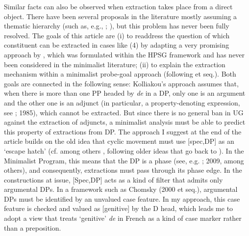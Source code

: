 \documentclass[output=paper]{langsci/langscibook}
\begin{document}
Similar facts can also be observed when extraction takes place from a direct object. There have been several proposals in the literature mostly assuming a thematic hierarchy (such as, e.g., \citealt{Pollock1989}; \citealt{Godard1992}), but this problem has never been fully resolved. The goals of this article are (i) to readdress the question of which constituent can be extracted in cases like (4) by adapting a very promising approach by \citet{Kolliakou1999}, which was formulated within the HPSG framework and has never been considered in the minimalist literature; (ii) to explain the extraction mechanism within a minimalist probe-goal approach (following \citealt{Chomsky2000} et seq.). Both goals are connected in the following sense: Kolliakou’s approach assumes that, when there is more than one PP headed by \textit{de} in a DP, only one is an argument and the other one is an adjunct (in particular, a property-denoting expression, see \citealt{Chierchia1982}; 1985), which cannot be extracted. But since there is no general ban in UG against the extraction of adjuncts, a minimalist analysis must be able to predict this property of extractions from DP. The approach I suggest at the end of the article builds on the old idea that cyclic movement must use [spec,DP] as an ‘escape hatch’ (cf. among others \citealt{Gavruseva2000}, following older ideas that go back to \citealt{Cinque1980}). In the Minimalist Program, this means that the DP is a phase (see, e.g. \citealt{Heck2008}; 2009, among others), and consequently, extractions must pass through its phase edge. In the constructions at issue, [Spec,DP] acts as a kind of filter that admits only argumental DPs. In a framework such as Chomsky (2000 et seq.), argumental DPs must be identified by an unvalued case feature. In my approach, this case feature is checked and valued as [genitive] by the D head, which leads me to adopt a view that treats ‘genitive’ \textit{de} in French as a kind of case marker rather than a preposition.
\end{document}
